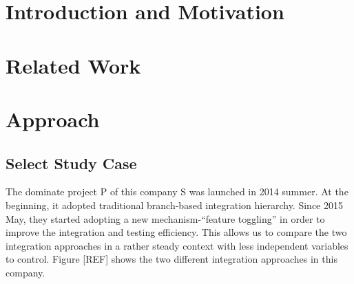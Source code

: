 %
%

\section{Introduction and Motivation}
\label{sec:intro}



\section{Related Work}
\label{sec:relatedWork}



\section{Approach}
\label{sec:appraoch}


\subsection{Select Study Case}
The dominate project P of this company S was launched in 2014 summer. At the beginning, it adopted traditional branch-based integration hierarchy. Since 2015 May, they started adopting a new mechanism-``feature toggling'' in order to improve the integration and testing efficiency. This allows us to compare the two integration approaches in a rather steady context with less independent variables to control. Figure [REF] shows the two different integration approaches in this company.



